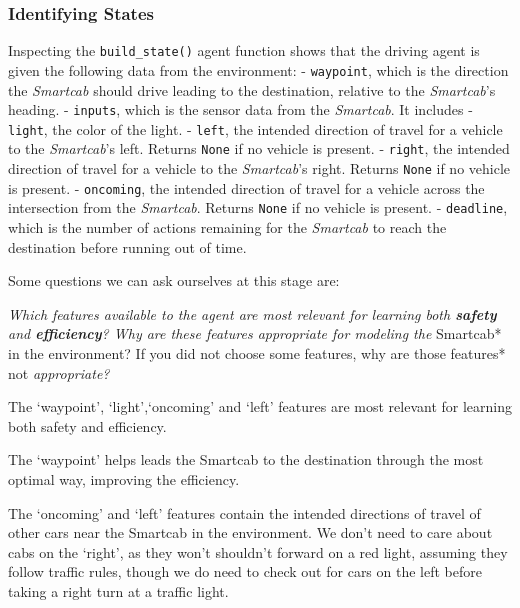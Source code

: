 \documentclass[11pt]{article}
\begin{document}
    \hypertarget{identifying-states}{%
\subsubsection{Identifying States}\label{identifying-states}}

Inspecting the
\texttt{\textquotesingle{}build\_state()\textquotesingle{}} agent
function shows that the driving agent is given the following data from
the environment: -
\texttt{\textquotesingle{}waypoint\textquotesingle{}}, which is the
direction the \emph{Smartcab} should drive leading to the destination,
relative to the \emph{Smartcab}'s heading. -
\texttt{\textquotesingle{}inputs\textquotesingle{}}, which is the sensor
data from the \emph{Smartcab}. It includes -
\texttt{\textquotesingle{}light\textquotesingle{}}, the color of the
light. - \texttt{\textquotesingle{}left\textquotesingle{}}, the intended
direction of travel for a vehicle to the \emph{Smartcab}'s left. Returns
\texttt{None} if no vehicle is present. -
\texttt{\textquotesingle{}right\textquotesingle{}}, the intended
direction of travel for a vehicle to the \emph{Smartcab}'s right.
Returns \texttt{None} if no vehicle is present. -
\texttt{\textquotesingle{}oncoming\textquotesingle{}}, the intended
direction of travel for a vehicle across the intersection from the
\emph{Smartcab}. Returns \texttt{None} if no vehicle is present. -
\texttt{\textquotesingle{}deadline\textquotesingle{}}, which is the
number of actions remaining for the \emph{Smartcab} to reach the
destination before running out of time.

    Some questions we can ask ourselves at this stage are:

\emph{Which features available to the agent are most relevant for
learning both \textbf{safety} and \textbf{efficiency}? Why are these
features appropriate for modeling the }Smartcab* in the environment? If
you did not choose some features, why are those features* not
\emph{appropriate?}

    The `waypoint', `light',`oncoming' and `left' features are most relevant
for learning both safety and efficiency.

The `waypoint' helps leads the Smartcab to the destination through the
most optimal way, improving the efficiency.

The `oncoming' and `left' features contain the intended directions of
travel of other cars near the Smartcab in the environment. We don't need
to care about cabs on the `right', as they won't shouldn't forward on a
red light, assuming they follow traffic rules, though we do need to
check out for cars on the left before taking a right turn at a traffic
light.
\end{document}
